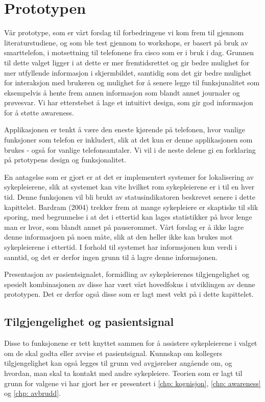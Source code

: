 \section{Prototypen}
\label{prototypen}

Vår prototype, som er vårt forslag til forbedringene vi kom frem til gjennom literaturstudiene, og som ble test gjennom to workshops, er basert på bruk av smarttelefon, i motsettning til telefonene fra cisco som er i bruk i dag. Grunnen til dette valget ligger i at dette er mer fremtidsrettet og gir bedre mulighet for mer utfyllende informasjon i skjermbildet, samtidig som det gir bedre mulighet for interaksjon med brukeren og mulighet for å senere legge til funksjunalitet som eksempelvis å hente frem annen informasjon som blandt annet journaler og prøvesvar. Vi har etterstebet å lage et intuitivt design, som gir god informasjon for å støtte awareness.

\noindent
Applikasjonen er tenkt å være den eneste kjørende på telefonen, hvor vanlige funksjoner som telefon er inkludert, slik at det kun er denne applikasjonen som brukes - også for vanlige telefonsamtaler. Vi vil i de neste delene gi en forklaring på prtotypens design og funksjonalitet.

\noindent
En antagelse som er gjort er at det er implementert systemer for lokalisering av sykepleierene, slik at systemet kan vite hvilket rom sykepleierene er i til en hver tid. Denne funksjonen vil bli brukt av statusindikatoren beskrevet senere i dette kapittelet. Bardram (2004) trekker frem at mange sykepleiere er skaptiske til slik sporing, med begrunnelse i at det i ettertid kan lages statistikker på hvor lenge man er hvor, som blandt annet på pauserommet. Vårt forslag er å ikke lagre denne informasjoen på noen måte, slik at den heller ikke kan brukes mot sykepleierene i ettertid. I forhold til systemet har informsjonen kun verdi i sanntid, og det er derfor ingen grunn til å lagre denne informsjonen.

\noindent
Presentasjon av pasientsignalet, formidling av sykepleierenes tilgjengelighet og spesielt kombinasjonen av disse har vært vårt hovedfokus i utviklingen av denne prototypen. Det er derfor også disse som er lagt mest vekt på i dette kapittelet.

\subsection{Tilgjengelighet og pasientsignal}
Disse to funksjonene er tett knyttet sammen for å assistere sykepleierene i valget om de skal godta eller avvise et pasientsignal. Kunnskap om kollegers tilgjengelighet kan også legges til grunn ved avgjørelser angående om, og hvordan, man skal ta kontakt med andre sykepleiere. Teorien som er lagt til grunn for valgene vi har gjort her er presentert i \ref{chp: kognisjon}, \ref{chp: awareness} og \ref{chp: avbrudd}.

